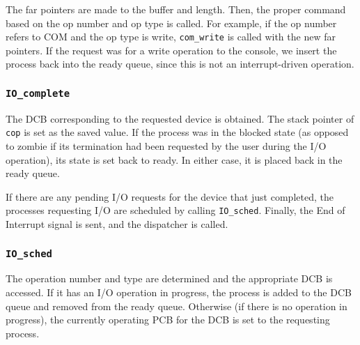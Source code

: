 The far pointers are made to the buffer and length. Then, the proper command based on the op number and op type is called. For example, if the op number refers to COM and the op type is write, {\tt com\_write} is called with the new far pointers. If the request was for a write operation to the console, we insert the process back into the ready queue, since this is not an interrupt-driven operation.

\subsubsection{\tt IO\_complete}

The DCB corresponding to the requested device is obtained. The stack pointer of {\tt cop} is set as the saved value. If the process was in the blocked state (as opposed to zombie if its termination had been requested by the user during the I/O operation), its state is set back to ready. In either case, it is placed back in the ready queue.

If there are any pending I/O requests for the device that just completed, the processes requesting I/O are scheduled by calling {\tt IO\_sched}. Finally, the End of Interrupt signal is sent, and the dispatcher is called.

\subsubsection{\tt IO\_sched}

The operation number and type are determined and the appropriate DCB is accessed. If it has an I/O operation in progress, the process is added to the DCB queue and removed from the ready queue. Otherwise (if there is no operation in progress), the currently operating PCB for the DCB is set to the requesting process.